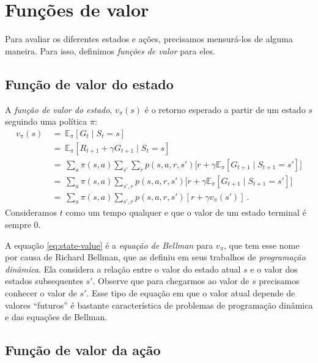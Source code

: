 \documentclass{article}
\begin{document}
    \section{Funções de valor}
        
        Para avaliar os diferentes estados e ações, precisamos mensurá-los de alguma maneira. Para isso, definimos \emph{funções de valor} para eles.

        \subsection{Função de valor do estado}
        
            A \emph{função de valor do estado}, $v_{\pi}(s)$ é o retorno esperado a partir de um estado $s$ seguindo uma política $\pi$:
            \begin{equation}
            \label{eq:state-value}
            \begin{split}
                v_{\pi}(s) & \ = \ \mathbb{E}_{\pi}[G_t \mid S_t = s] \\
                & \ = \ \mathbb{E}_{\pi}[R_{t+1} + \gamma G_{t+1} \mid S_t = s] \\
                & \ = \ \sum_{a} \pi(s,a) \sum_{s'} \sum_{r} p(s, a, r, s') \Big[r + \gamma \mathbb{E}_{\pi}[ G_{t+1} \mid S_{t+1} = s'] \Big]\\
                & \ = \ \sum_{a} \pi(s,a) \sum_{s',r} p(s, a, r, s') \Big[r + \gamma \mathbb{E}_{\pi}[ G_{t+1} \mid S_{t+1} = s'] \Big]\\
                & \ = \ \sum_{a} \pi(s,a) \sum_{s', r} p(s, a, r, s') [r + \gamma v_{\pi}(s')]\ .
            \end{split}
            \end{equation}
            Consideramos $t$ como um tempo qualquer e que o valor de um estado terminal é sempre $0$.

            A equação \eqref{eq:state-value} é a \emph{equação de Bellman} para $v_{\pi}$, que tem esse nome por causa de Richard Bellman, que as definiu em seus trabalhos de \emph{programação dinâmica}. Ela considera a relação entre o valor do estado atual $s$ e o valor dos estados subsequentes $s'$. Observe que para chegarmos ao valor de $s$ precisamos conhecer o valor de $s'$. Esse tipo de equação em que o valor atual depende de valores ``futuros'' é bastante característica de problemas de programação dinâmica e das equações de Bellman.
        
        \subsection{Função de valor da ação}
        
\end{document}
